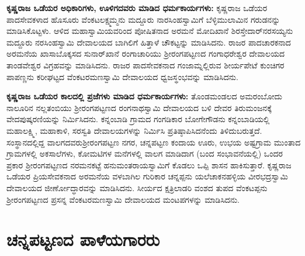 \newpage

\textbf{ಕೃಷ್ಣರಾಜ ಒಡೆಯರ ಅಧಿಕಾರಿಗಳು, ಊಳಿಗದವರು ಮಾಡಿದ ಧರ್ಮಕಾರ್ಯಗಳು: } ಕೃಷ್ಣರಾಜ ಒಡೆಯರ ಪಾದಸೇವಕಳಾದ ಹೊಸೂರು ವೆಂಕಟಲಕ್ಷ್ಮಮ್ಮನು ಮದ್ದೂರು ನಾರಸಿಂಹಸ್ವಾಮಿಗೆ ಬೆಳ್ಳಿಮುಲಾಮಿನ ಗರುಡನನ್ನು ಮಾಡಿಸಿ\-ಕೊಟ್ಟಳು. ಆಳಿದ ಮಹಾಸ್ವಾಮಿಯವರಿಂದ ಪೋಷಿತನಾದ ಅರಮನೆ ಮೋದಿಖಾನೆ ಶಿರಸ್ತೇದಾರ್​ ನರಸಯ್ಯನು ಮದ್ದೂರು ನರಸಿಂಹಸ್ವಾಮಿ ದೇವಾಲಯದ ಬಾಗಿಲಿಗೆ ಹಿತ್ತಾಳೆ ಚೌಕಟ್ಟನ್ನು ಮಾಡಿಸಿದನು. ರಾಜರ ಪಾದಚಾರಕನಾದ ಅರಮನೆಯ ಖಾಸಾಬೊಕ್ಕಸದ ಸುನಾರ್​ಖಾನೆ ರಂಗಾಚಾರಿಯು ಶ‍್ರೀರಂಗಪಟ್ಟಣದ ಗಂಗಾಧರೇಶ್ವರ ದೇವಾಲಯದ ತಾಂಡವೇಶ್ವರ ವಿಗ್ರಹವನ್ನು ಮಾಡಿಸಿದನು. ರಾಜರ ಪಾದಸೇವಕನಾದ ಗಂಜಾಮ್ನಲ್ಲಿರುವ ಶೀರ್ಯಪೇಟೆ ಕುಂಚಿಗರ ಪಾಪಣ್ಣನು ಕರೀಘಟ್ಟದ ವೆಂಕಟರಮಣಸ್ವಾಮಿ ದೇವಾಲಯದ ಧ್ವಜಸ್ಥಂಭವನ್ನು ಮಾಡಿಸಿದನು.

\textbf{ಕೃಷ್ಣರಾಜ ಒಡೆಯರ ಕಾಲದಲ್ಲಿ ಪ್ರಜೆಗಳು ಮಾಡಿದ ಧರ್ಮಕಾರ್ಯಗಳು: } ತೊಂಡಮಂಡಲದ ಅಮರಂಬೋದು ನಾಲೂರಿನ ನಲ್ಲತಂಬಿಯು ಶ‍್ರೀರಂಗಪಟ್ಟಣದ ರಂಗನಾಥಸ್ವಾಮಿ ದೇವಾಲಯದ ಬಳಿ ದೇವರ ತಿರುಮಂಜನಕ್ಕೆ ವೇದಪುಷ್ಕರಣಿ\-ಯನ್ನು ನಿರ್ಮಿಸಿದನು. ಕನ್ನಂಬಾಡಿ ಗ್ರಾಮದ ಗಂಗಡಿಕಾರ ಬೋಗೇಗೌಡನು ಕನ್ನಂಬಾಡಿಯಲ್ಲಿ ಮಹಾಲಕ್ಷ್ಮಿ, ಮಹಾಕಾಳಿ, ಸರಸ್ವತಿ ದೇವಾಲಯಗಳನ್ನು ನಿರ್ಮಿಸಿ ಪ್ರತಿಷ್ಠಾಪಿಸಿದನೆಂದು ತಿಳಿದುಬರುತ್ತದೆ. ಸಂಸ್ಥಾನದಲ್ಲಿದ್ದ ವಾಲಗದವರು\break ಶ‍್ರೀರಂಗಪಟ್ಟಣ ನಗರ, ಚನ್ನಪಟ್ಟಣ ಕಂದಾಯ ಊರು, ಉಭಯ ಅಷ್ಟಗ್ರಾಮ ಮುಂತಾದ ಗ್ರಾಮಗಳಲ್ಲಿ ಅಕಸಾಲೆಗಳು, ಕೋಮಟಿಗಳ ಮನೆಗಳಲ್ಲಿ ವಾಲಗ ಮಾಡಿದಾಗ (ಬಂದ ಸಂಭಾವನೆಯಲ್ಲಿ) ಒಂದರ ಪ್ರಕಾರ ಶ‍್ರೀರಂಗಪಟ್ಟಣದ ನರಮನಕಟ್ಟೆ ಹನುಮಂತರಾಯಸ್ವಾಮಿಗೆ ಕೊಡಲು ಒಪ್ಪಿ ಶಾಸನ ಹಾಕಿಸುತ್ತಾರೆ. ಕೃಷ್ಣರಾಜ ಒಡೆಯರ ಪ್ರಿಯಸೇವಕನಾದ ಅರಮನೆಯ ವಳಬಾಗಿಲ ಗುರಿಕಾರ ಚನ್ನಪ್ಪನು ಯಲೆಚಾಕನಹಳ್ಳಿಯ ವೀರಭದ್ರಸ್ವಾಮಿ ದೇವಾಲಯದ ಜೀರ್ಣೋದ್ಧಾರವನ್ನು ಮಾಡಿಸಿ\-ದನು. ಸೀರ್ಯದ ಕ್ಷತ್ರಿಲಾಡರಿ ವಂಶದ ತುಪದ ವೆಂಕಟಪ್ಪನು ಶ‍್ರೀರಂಗಪಟ್ಟಣದ ಪ್ರಸನ್ನ ವೆಂಕಟರಮಣಸ್ವಾಮಿ ದೇವಾಲಯದ ಮಂಟಪಗಳನ್ನು ಮಾಡಿಸಿದನು.


\section{ಚನ್ನಪಟ್ಟಣದ ಪಾಳೆಯಗಾರರು}

